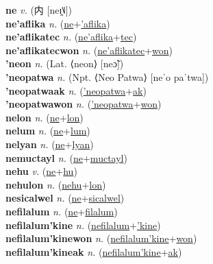\textbf{ne} \textit{v.} ({\chinese{}内} [neɪ̯˥˩])
 \label{ne} \\
\textbf{ne'aflika} \textit{n.} (\hyperref[ne]{ne}+\hyperref['aflika]{'aflika})
 \label{ne'aflika} \\
\textbf{ne'aflikatec} \textit{n.} (\hyperref[ne'aflika]{ne'aflika}+\hyperref[tec]{tec})
 \label{ne'aflikatec} \\
\textbf{ne'aflikatecwon} \textit{n.} (\hyperref[ne'aflikatec]{ne'aflikatec}+\hyperref[won]{won})
 \label{ne'aflikatecwon} \\
\textbf{'neon} \textit{n.} (Lat. ⟨neon⟩ [neɔ̃])
 \label{'neon} \\
\textbf{'neopatwa} \textit{n.} (Npt. ⟨Neo Patwa⟩ [neˈo paˈtwa])
 \label{'neopatwa} \\
\textbf{'neopatwaak} \textit{n.} (\hyperref['neopatwa]{'neopatwa}+\hyperref[ak]{ak})
 \label{'neopatwaak} \\
\textbf{'neopatwawon} \textit{n.} (\hyperref['neopatwa]{'neopatwa}+\hyperref[won]{won})
 \label{'neopatwawon} \\
\textbf{nelon} \textit{n.} (\hyperref[ne]{ne}+\hyperref[lon]{lon})
 \label{nelon} \\
\textbf{nelum} \textit{n.} (\hyperref[ne]{ne}+\hyperref[lum]{lum})
 \label{nelum} \\
\textbf{nelyan} \textit{n.} (\hyperref[ne]{ne}+\hyperref[lyan]{lyan})
 \label{nelyan} \\
\textbf{nemuctayl} \textit{n.} (\hyperref[ne]{ne}+\hyperref[muctayl]{muctayl})
 \label{nemuctayl} \\
\textbf{nehu} \textit{v.} (\hyperref[ne]{ne}+\hyperref[hu]{hu})
 \label{nehu} \\
\textbf{nehulon} \textit{n.} (\hyperref[nehu]{nehu}+\hyperref[lon]{lon})
 \label{nehulon} \\
\textbf{nesicalwel} \textit{n.} (\hyperref[ne]{ne}+\hyperref[sicalwel]{sicalwel})
 \label{nesicalwel} \\
\textbf{nefilalum} \textit{n.} (\hyperref[ne]{ne}+\hyperref[filalum]{filalum})
 \label{nefilalum} \\
\textbf{nefilalum'kine} \textit{n.} (\hyperref[nefilalum]{nefilalum}+\hyperref['kine]{'kine})
 \label{nefilalum'kine} \\
\textbf{nefilalum'kinewon} \textit{n.} (\hyperref[nefilalum'kine]{nefilalum'kine}+\hyperref[won]{won})
 \label{nefilalum'kinewon} \\
\textbf{nefilalum'kineak} \textit{n.} (\hyperref[nefilalum'kine]{nefilalum'kine}+\hyperref[ak]{ak})
 \label{nefilalum'kineak} \\
